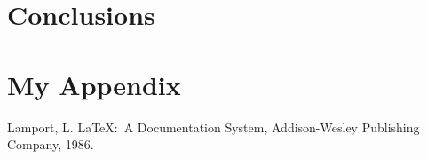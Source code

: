 \chapter{Conclusions}


\appendix
\chapter{My Appendix}




\begin{thebibliography}{99}
  Lamport, L.  LaTeX:~A Documentation System, Addison-Wesley Publishing Company, 1986.
\end{thebibliography}

